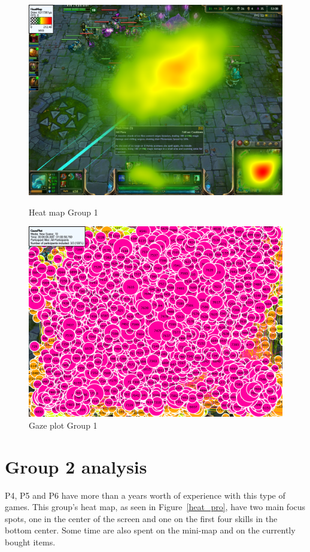 \documentclass[notitlepage]{report}
\begin{document}
\begin{figure}[!ht]
\begin{minipage}[b]{0.45\linewidth}
\centering
\includegraphics[width=\textwidth]{images/heatmap/Noobs}
\caption{Heat map Group 1}
\label{heat_noob}
\end{minipage}
\hspace{0.5cm}
\begin{minipage}[b]{0.45\linewidth}
\centering
\includegraphics[width=\textwidth]{images/gazeplot/Noobs}
\caption{Gaze plot Group 1}
\label{gaze_noob}
\end{minipage}
\end{figure}

\section{Group 2 analysis}
P4, P5 and P6 have more than a years worth of experience with this type of games. This group's heat map, as seen in Figure~\ref{heat_pro}, have two main focus spots, one in the center of the screen and one on the first four skills in the bottom center. Some time are also spent on the mini-map and on the currently bought items.
\end{document}
